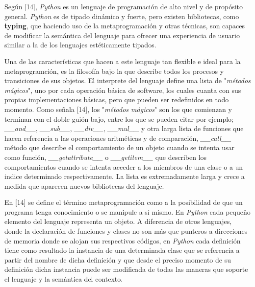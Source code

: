 Según [14], {\it Python} es un lenguaje de programación de alto nivel y de propósito general.
      {\it Python} es de tipado dinámico y fuerte, pero existen bibliotecas, como {\bf typing}, que haciendo
uso de la metaprogramación y otras técnicas, son capaces de modificar la semántica del
lenguaje para ofrecer una experiencia de usuario similar a la de los lenguajes estéticamente
tipados.

Una de las características que hacen a este lenguaje tan flexible e ideal para la metaprogramción,
es la filosofía bajo la que describe todos los procesos y transiciones de sus objetos. El
interprete del lenguaje define una lista de "{\it métodos mágicos}", uno por cada operación básica
de software, los cuales cuanta con sus propias implementaciones básicas, pero que pueden ser
redefinidos en todo momento. Como señala [14], los "{\it métodos mágicos}" son los que comienzan y
terminan con el doble guión bajo, entre los que se pueden citar por ejemplo;
{\it \_\_and\_\_}, {\it \_\_sub\_\_}, {\it \_\_div\_\_}, {\it \_\_mul\_\_} y otra larga lista de funciones que hacen referencia
a las operaciones aritméticas y de comparación, {\it\_\_call\_\_} método que describe el comportamiento
de un objeto cuando se intenta usar como función, {\it \_\_getattribute\_\_} o {\it \_\_getitem\_\_}
que describen los comportamientos cuando se intenta acceder a los miembros de una clase o a
un indice determinado respectivamente. La lista es extremadamente larga y crece a medida
que aparecen nuevos bibliotecas del lenguaje.

En [14] se define el término metaprogramación como a la posibilidad de que un programa tenga
conocimiento o se manipule a sí mismo. En {\it Python} cada pequeño elemento del lenguaje
representa un objeto. A diferencia de otros lenguajes, donde la declaración de funciones y
clases no son más que punteros a direcciones de memoria donde se alojan sus respectivos códigos,
en {\it Python} cada definición tiene como resultado la instancia de una determinada clase que se
referencia a partir del nombre de dicha definición y que desde el preciso momento de su
definición dicha instancia puede ser modificada de todas las maneras que soporte el lenguaje
y la semántica del contexto.

